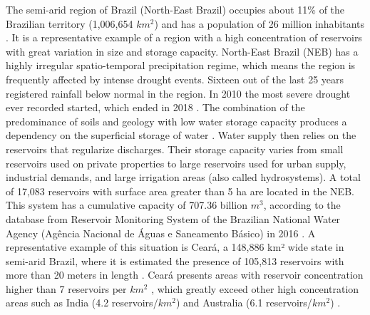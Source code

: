 \documentclass[draft]{agujournal2019}
\begin{document}
The semi-arid region of Brazil (North-East Brazil) occupies about 11\% of the Brazilian territory (1,006,654 $km^2$) and has a population of 26 million inhabitants \cite{Marengo2020}. It is a representative example of a region with a high concentration of reservoirs with great variation in size and storage capacity. North-East Brazil (NEB) has a highly irregular spatio-temporal precipitation regime, which means the region is frequently affected by intense drought events. Sixteen out of the last 25 years registered rainfall below normal in the region. In 2010 the most severe drought ever recorded started, which ended in 2018 \cite{MarengoOrsini2018,Marengo2017}. The combination of the predominance of soils and geology with low water storage capacity produces a dependency on the superficial storage of water \cite{Marengo2017,Rossato2017}. Water supply then relies on the reservoirs that regularize discharges. Their storage capacity varies from small reservoirs used on private properties to large reservoirs used for urban supply, industrial demands, and large irrigation areas (also called hydrosystems). A total of 17,083 reservoirs with surface area greater than 5 ha are located in the NEB. This system has a cumulative capacity of 707.36 billion $m^3$, according to the database from Reservoir Monitoring System of the Brazilian National Water Agency (Agência Nacional de Águas e Saneamento Básico) in 2016 \cite{Nascimento2017}. A representative example of this situation is Ceará, a 148,886 km² wide state in semi-arid Brazil, where it is estimated the presence of 105,813 reservoirs with more than 20 meters in length \cite{FUNCEME2021}. Ceará presents areas with reservoir concentration higher than 7 reservoirs per $km^2$ \cite{RibeiroNeto2022}, which greatly exceed other high concentration areas such as India (4.2 reservoirs/$km^2$) and Australia (6.1 reservoirs/$km^2$) \cite{Rabelo2021}.\\
\end{document}
